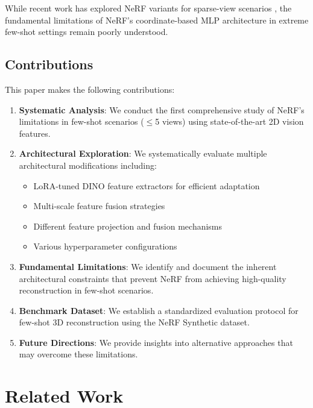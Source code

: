 \documentclass[11pt]{article}
\begin{document}
While recent work has explored NeRF variants for sparse-view scenarios \cite{yu2021pixelnerf, jain2021putting}, the fundamental limitations of NeRF's coordinate-based MLP architecture in extreme few-shot settings remain poorly understood.

\subsection{Contributions}

This paper makes the following contributions:

\begin{enumerate}
    \item \textbf{Systematic Analysis}: We conduct the first comprehensive study of NeRF's limitations in few-shot scenarios ($\leq$5 views) using state-of-the-art 2D vision features.
    
    \item \textbf{Architectural Exploration}: We systematically evaluate multiple architectural modifications including:
    \begin{itemize}
        \item LoRA-tuned DINO feature extractors for efficient adaptation
        \item Multi-scale feature fusion strategies
        \item Different feature projection and fusion mechanisms
        \item Various hyperparameter configurations
    \end{itemize}
    
    \item \textbf{Fundamental Limitations}: We identify and document the inherent architectural constraints that prevent NeRF from achieving high-quality reconstruction in few-shot scenarios.
    
    \item \textbf{Benchmark Dataset}: We establish a standardized evaluation protocol for few-shot 3D reconstruction using the NeRF Synthetic dataset.
    
    \item \textbf{Future Directions}: We provide insights into alternative approaches that may overcome these limitations.
\end{enumerate}

\section{Related Work}
\end{document}

